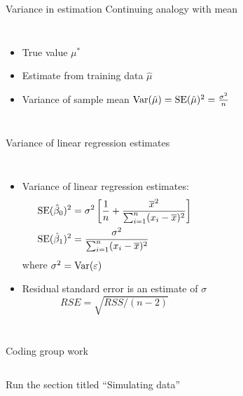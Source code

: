 \documentclass[aspectratio=169,usenames,dvipsnames]{beamer}
\newcommand{\InstructorNotes}[1]{\textit{\color{orange}#1}}
\newcommand{\InstructorList}[1]{
\begin{itemize}
	\color{orange}
	#1
\end{itemize}
}
\renewcommand{\InstructorNotes}[1]{}
\renewcommand{\InstructorList}[1]{}
\begin{document}
\begin{frame}[t]{Variance in estimation}
	{Continuing analogy with mean}

\begin{columns}
\centering

\begin{itemize}
	\item True value $\mu^*$
	\item Estimate from training data $\hat \mu$
	\item Variance of sample mean $\mathrm{Var}(\hat \mu) = \mathrm{SE}(\hat \mu)^2 = \frac{\sigma^2}{n}$
	\end{itemize}
\InstructorList{
  \item Standard error 
  \item The more data you have, the smaller variance, the better the estimate 
  \item the law of large numbers (LLN)
}
\end{columns}

\end{frame}
\begin{frame}[t]{Variance of linear regression estimates }
\begin{columns}
\centering
\centering
\begin{itemize}
	\item Variance of linear regression estimates:
	\begin{align*}
		\mathrm{SE}(\hat \beta_0)^2
				&= \sigma^2 \left[ \frac{1}{n} + \frac{\overline x^2}{\sum_{i=1}^n (x_i - \overline x)^2}\right]\\
		\mathrm{SE}(\hat \beta_1)^2 &= \frac{\sigma^2}{\sum_{i=1}^n (x_i - \overline x)^2}
	\end{align*}
	where $\sigma^2 = \mathrm{Var}(\varepsilon)$
	\item Residual standard error is an estimate of $\sigma$
	\begin{equation*}
		RSE = \sqrt{RSS/ (n-2)}
	\end{equation*}
\end{itemize}
\centering
\InstructorNotes{if data are more spreadout the SE is smaller}

\end{columns}
\end{frame}
{
\begin{frame}[t]{Coding group work}
\begin{columns}
\centering
Run the section titled ``Simulating data''

\centering
\InstructorNotes{Didn't quite finish this in class Fall 2023, had them just run the part of the code that got the simulation up and running to the point of having a histogram. Moved the variance slides to next class}
\end{columns}
\end{frame}
}
\end{document}
